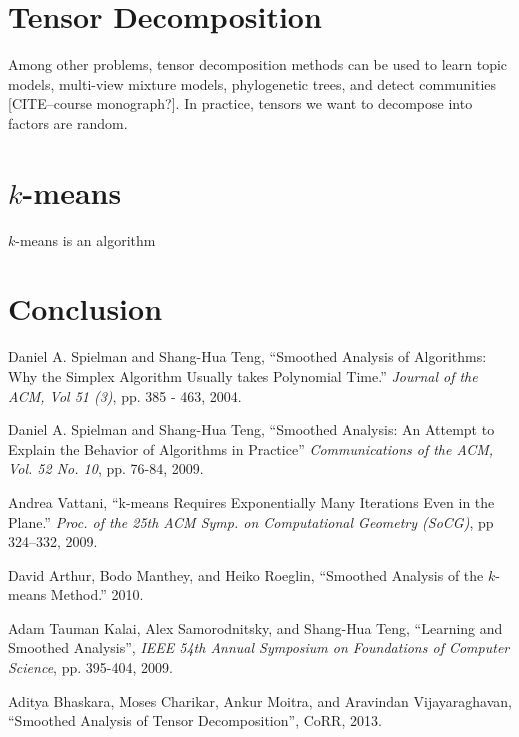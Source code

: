 \documentclass[11pt]{article}
\theoremstyle{definition}
\begin{document}
\section{Tensor Decomposition}
Among other problems, tensor decomposition methods can be used to
learn topic models, multi-view mixture models, phylogenetic trees, and
detect communities [CITE--course monograph?]. In practice, tensors we
want to decompose into factors are random.

\section{$k$-means}
$k$-means is an algorithm 
\section{Conclusion}

\begin{thebibliography}{1}
    Daniel A. Spielman and Shang{-}Hua Teng,
    ``Smoothed Analysis of Algorithms: Why the Simplex Algorithm Usually takes Polynomial Time.''
    \emph{Journal of the ACM, Vol 51 (3)},
    pp. 385 - 463,
    2004.

    Daniel A. Spielman and Shang{-}Hua Teng,
    ``Smoothed Analysis: An Attempt to Explain the Behavior of Algorithms in Practice''
    \emph{Communications of the ACM, Vol. 52 No. 10},
    pp. 76-84,
    2009.

    Andrea Vattani,
    ``k-means Requires Exponentially Many Iterations Even in the Plane.'' 
    \emph{ Proc. of the 25th ACM Symp. on Computational Geometry (SoCG)}, 
    pp 324–332, 
    2009.
    
    David Arthur, Bodo Manthey, and Heiko Roeglin,
    ``Smoothed Analysis of the $k$-means Method.''
    2010.

    Adam Tauman Kalai, Alex Samorodnitsky, and Shang{-}Hua Teng, 
    ``Learning and Smoothed Analysis'',
    \emph{IEEE 54th Annual Symposium on Foundations of Computer Science}, 
    pp. 395-404,
    2009.

    Aditya Bhaskara, Moses Charikar, Ankur Moitra, and Aravindan Vijayaraghavan,
    ``Smoothed Analysis of Tensor Decomposition'',
    CoRR,
    2013.

\end{thebibliography}
\end{document}
